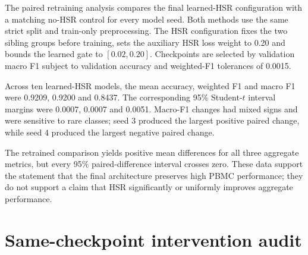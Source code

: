 \documentclass[10pt]{article}
\begin{document}
The paired retraining analysis compares the final learned-HSR configuration with a matching no-HSR control for every model seed. Both methods use the same strict split and train-only preprocessing. The HSR configuration fixes the two sibling groups before training, sets the auxiliary HSR loss weight to 0.20 and bounds the learned gate to $[0.02,0.20]$. Checkpoints are selected by validation macro F1 subject to validation accuracy and weighted-F1 tolerances of 0.0015.

\begin{table}[H]
\centering
\caption{Per-seed PBMC strict-L3 metrics for retrained no-HSR controls and learned-HSR models. The last column is the learned-HSR minus control macro-F1 difference.}
\label{tab:seed-pairing}
\footnotesize
\setlength{\tabcolsep}{4pt}

\end{table}

Across ten learned-HSR models, the mean accuracy, weighted F1 and macro F1 were 0.9209, 0.9200 and 0.8437. The corresponding 95\% Student-$t$ interval margins were 0.0007, 0.0007 and 0.0051. Macro-F1 changes had mixed signs and were sensitive to rare classes; seed 3 produced the largest positive paired change, while seed 4 produced the largest negative paired change.

\begin{table}[H]
\centering
\caption{Paired statistical tests for learned-HSR effects. ``Retrained control'' compares separately trained learned-HSR and no-HSR models. ``Same checkpoint'' disables the HSR correction inside each selected learned-HSR checkpoint. Wilcoxon $P$ values use the one-sided greater alternative; paired $t$ tests are two-sided. No row meets a 0.05 significance threshold.}
\label{tab:statistics}
\footnotesize
\setlength{\tabcolsep}{4pt}

\end{table}

The retrained comparison yields positive mean differences for all three aggregate metrics, but every 95\% paired-difference interval crosses zero. These data support the statement that the final architecture preserves high PBMC performance; they do not support a claim that HSR significantly or uniformly improves aggregate performance.

\section{Same-checkpoint intervention audit}
\end{document}
